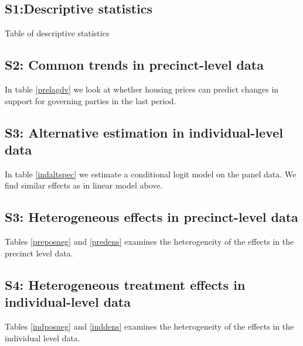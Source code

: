 \documentclass[12pt,a4paper]{article}
\begin{document}
\subsection*{S1:Descriptive statistics}

Table of descriptive statistics

\newpage

\subsection*{S2: Common trends in precinct-level data}
In table \ref{prelagdv} we look at whether housing prices can predict changes in support for governing parties in the last period. 




\newpage

\subsection*{S3: Alternative estimation in individual-level data}
In table \ref{indaltspec} we estimate a conditional logit model on the panel data. We find similar effects as in linear model above.



\newpage

\subsection*{S3: Heterogeneous effects in precinct-level data}
Tables \ref{preposneg} and \ref{predens} examines the heterogeneity of the effects in the precinct level data.





\newpage


\subsection*{S4: Heterogeneous treatment effects in individual-level data}
Tables \ref{indposneg} and \ref{inddens} examines the heterogeneity of the effects in the individual level data.




\end{document}
